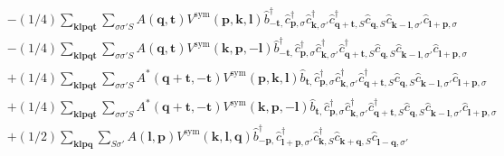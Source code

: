 \begin{align*}
	&-(1/4) \sum_{ \mathbf{k} \mathbf{l} \mathbf{p} \mathbf{q} \mathbf{t} } \sum_{ \sigma \sigma' S } A( \mathbf{q}, \mathbf{t} )  V^\mathrm{sym}( \mathbf{p}, \mathbf{k}, \mathbf{l} )   \hat{b}_{ -\mathbf{t}, }^\dagger  \hat{c}_{ \mathbf{p}, \sigma }^\dagger  \hat{c}_{ \mathbf{k}, \sigma' }^\dagger  \hat{c}_{ \mathbf{q}+\mathbf{t}, S }^\dagger  \hat{c}_{ \mathbf{q}, S }^{\phantom{\dagger}} \hat{c}_{ \mathbf{k}-\mathbf{l}, \sigma' }^{\phantom{\dagger}} \hat{c}_{ \mathbf{l}+\mathbf{p}, \sigma }^{\phantom{\dagger}}  \\
	&-(1/4) \sum_{ \mathbf{k} \mathbf{l} \mathbf{p} \mathbf{q} \mathbf{t} } \sum_{ \sigma \sigma' S } A( \mathbf{q}, \mathbf{t} )  V^\mathrm{sym}( \mathbf{k}, \mathbf{p}, -\mathbf{l} )   \hat{b}_{ -\mathbf{t}, }^\dagger  \hat{c}_{ \mathbf{p}, \sigma }^\dagger  \hat{c}_{ \mathbf{k}, \sigma' }^\dagger  \hat{c}_{ \mathbf{q}+\mathbf{t}, S }^\dagger  \hat{c}_{ \mathbf{q}, S }^{\phantom{\dagger}} \hat{c}_{ \mathbf{k}-\mathbf{l}, \sigma' }^{\phantom{\dagger}} \hat{c}_{ \mathbf{l}+\mathbf{p}, \sigma }^{\phantom{\dagger}}  \\
	&+(1/4) \sum_{ \mathbf{k} \mathbf{l} \mathbf{p} \mathbf{q} \mathbf{t} } \sum_{ \sigma \sigma' S } A^*( \mathbf{q}+\mathbf{t}, -\mathbf{t} )  V^\mathrm{sym}( \mathbf{p}, \mathbf{k}, \mathbf{l} )   \hat{b}_{ \mathbf{t}, }^{\phantom{\dagger}} \hat{c}_{ \mathbf{p}, \sigma }^\dagger  \hat{c}_{ \mathbf{k}, \sigma' }^\dagger  \hat{c}_{ \mathbf{q}+\mathbf{t}, S }^\dagger  \hat{c}_{ \mathbf{q}, S }^{\phantom{\dagger}} \hat{c}_{ \mathbf{k}-\mathbf{l}, \sigma' }^{\phantom{\dagger}} \hat{c}_{ \mathbf{l}+\mathbf{p}, \sigma }^{\phantom{\dagger}}  \\
	&+(1/4) \sum_{ \mathbf{k} \mathbf{l} \mathbf{p} \mathbf{q} \mathbf{t} } \sum_{ \sigma \sigma' S } A^*( \mathbf{q}+\mathbf{t}, -\mathbf{t} )  V^\mathrm{sym}( \mathbf{k}, \mathbf{p}, -\mathbf{l} )   \hat{b}_{ \mathbf{t}, }^{\phantom{\dagger}} \hat{c}_{ \mathbf{p}, \sigma }^\dagger  \hat{c}_{ \mathbf{k}, \sigma' }^\dagger  \hat{c}_{ \mathbf{q}+\mathbf{t}, S }^\dagger  \hat{c}_{ \mathbf{q}, S }^{\phantom{\dagger}} \hat{c}_{ \mathbf{k}-\mathbf{l}, \sigma' }^{\phantom{\dagger}} \hat{c}_{ \mathbf{l}+\mathbf{p}, \sigma }^{\phantom{\dagger}}  \\
	&+(1/2) \sum_{ \mathbf{k} \mathbf{l} \mathbf{p} \mathbf{q} } \sum_{ S \sigma' } A( \mathbf{l}, \mathbf{p} )  V^\mathrm{sym}( \mathbf{k}, \mathbf{l}, \mathbf{q} )   \hat{b}_{ -\mathbf{p}, }^\dagger  \hat{c}_{ \mathbf{l}+\mathbf{p}, \sigma' }^\dagger  \hat{c}_{ \mathbf{k}, S }^\dagger  \hat{c}_{ \mathbf{k}+\mathbf{q}, S }^{\phantom{\dagger}} \hat{c}_{ \mathbf{l}-\mathbf{q}, \sigma' }^{\phantom{\dagger}}  \\

\end{align*}
